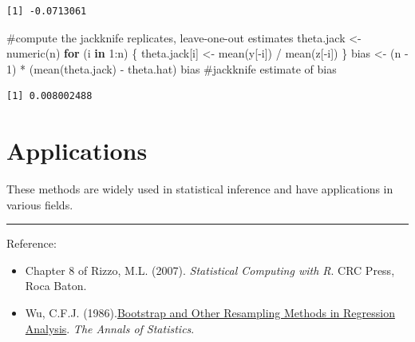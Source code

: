 \documentclass[
  letterpaper,
  DIV=11,
  numbers=noendperiod]{scrreprt}
\newenvironment{Shaded}{\begin{snugshade}}{\end{snugshade}}
\newcommand{\CommentTok}[1]{\textcolor[rgb]{0.37,0.37,0.37}{#1}}
\newcommand{\ControlFlowTok}[1]{\textcolor[rgb]{0.00,0.23,0.31}{\textbf{#1}}}
\newcommand{\DecValTok}[1]{\textcolor[rgb]{0.68,0.00,0.00}{#1}}
\newcommand{\FunctionTok}[1]{\textcolor[rgb]{0.28,0.35,0.67}{#1}}
\newcommand{\NormalTok}[1]{\textcolor[rgb]{0.00,0.23,0.31}{#1}}
\newcommand{\OtherTok}[1]{\textcolor[rgb]{0.00,0.23,0.31}{#1}}
\newcommand{\SpecialCharTok}[1]{\textcolor[rgb]{0.37,0.37,0.37}{#1}}
\begin{document}
\begin{verbatim}
[1] -0.0713061
\end{verbatim}

\begin{Shaded}
\begin{Highlighting}[]
\CommentTok{\#compute the jackknife replicates, leave{-}one{-}out estimates}
\NormalTok{theta.jack }\OtherTok{\textless{}{-}} \FunctionTok{numeric}\NormalTok{(n)}
\ControlFlowTok{for}\NormalTok{ (i }\ControlFlowTok{in} \DecValTok{1}\SpecialCharTok{:}\NormalTok{n) \{}
\NormalTok{  theta.jack[i] }\OtherTok{\textless{}{-}} \FunctionTok{mean}\NormalTok{(y[}\SpecialCharTok{{-}}\NormalTok{i]) }\SpecialCharTok{/} \FunctionTok{mean}\NormalTok{(z[}\SpecialCharTok{{-}}\NormalTok{i])}
\NormalTok{\}}
\NormalTok{bias }\OtherTok{\textless{}{-}}\NormalTok{ (n }\SpecialCharTok{{-}} \DecValTok{1}\NormalTok{) }\SpecialCharTok{*}\NormalTok{ (}\FunctionTok{mean}\NormalTok{(theta.jack) }\SpecialCharTok{{-}}\NormalTok{ theta.hat)  }
\NormalTok{bias }\CommentTok{\#jackknife estimate of bias}
\end{Highlighting}
\end{Shaded}

\begin{verbatim}
[1] 0.008002488
\end{verbatim}

\section{Applications}\label{applications}

These methods are widely used in statistical inference and have
applications in various fields.

\begin{center}\rule{0.5\linewidth}{0.5pt}\end{center}

Reference:

\begin{itemize}
\item
  Chapter 8 of Rizzo, M.L. (2007). \emph{Statistical Computing with R}.
  CRC Press, Roca Baton.
\item
  Wu, C.F.J.
  (1986).\href{https://projecteuclid.org/journals/annals-of-statistics/volume-14/issue-4/Jackknife-Bootstrap-and-Other-Resampling-Methods-in-Regression-Analysis/10.1214/aos/1176350142.full}{Bootstrap
  and Other Resampling Methods in Regression Analysis}. \emph{The Annals
  of Statistics}.
\end{itemize}
\end{document}
